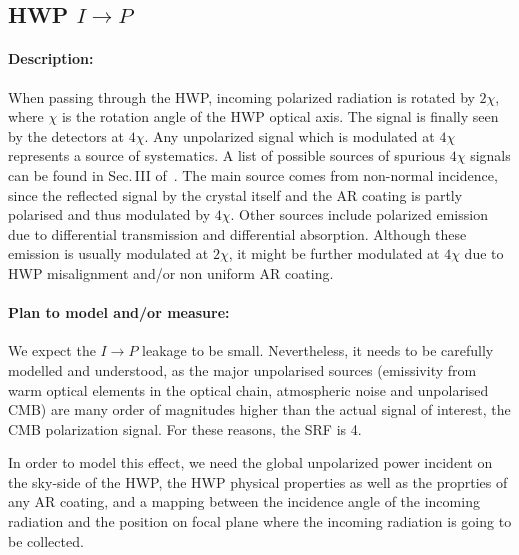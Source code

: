 \subsection{HWP $I\rightarrow P$}
\label{IP downstream of HWP}
\paragraph{Description:}
When passing through the HWP, incoming polarized radiation is rotated by $2\chi$, where $\chi$ is the rotation angle of the HWP optical axis. The signal is finally seen by the detectors at $4\chi$. Any unpolarized signal which is modulated at $4\chi$ represents a source of systematics. A list of possible sources of spurious $4\chi$ signals can be found in Sec.\,III of~\cite{Kusaka_ABS}. The main source comes from non-normal incidence, since the reflected signal by the crystal itself and the AR coating is partly polarised and thus modulated by $4\chi$. Other sources include polarized emission due to differential transmission and differential absorption. Although these emission is usually modulated at $2\chi$, it might be further modulated at $4\chi$ due to HWP misalignment and/or non uniform AR coating.

\paragraph{Plan to model and/or measure:}
We expect the $I\rightarrow P$ leakage to be small. Nevertheless, it needs to be carefully modelled and understood, as the major unpolarised sources (emissivity from warm optical elements in the optical chain, atmospheric noise and unpolarised CMB) are many order of magnitudes higher than the actual signal of interest, the CMB polarization signal. For these reasons, the SRF is 4.

In order to model this effect, we need the global unpolarized power incident on the sky-side of the HWP, the HWP physical properties as well as the proprties of any AR coating, and a mapping between the incidence angle of the incoming radiation and the position on focal plane where the incoming radiation is going to be collected. 

